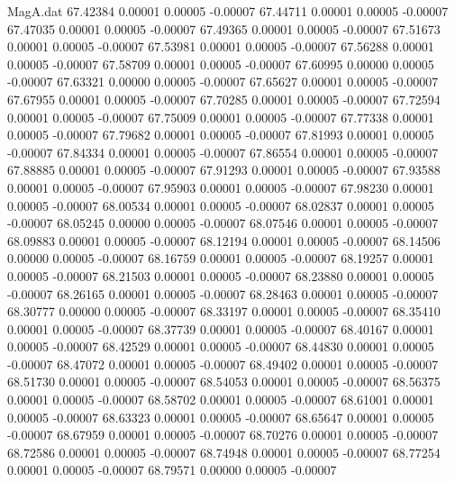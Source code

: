 \begin{filecontents}{MagA.dat}
  67.42384    0.00001    0.00005   -0.00007
  67.44711    0.00001    0.00005   -0.00007
  67.47035    0.00001    0.00005   -0.00007
  67.49365    0.00001    0.00005   -0.00007
  67.51673    0.00001    0.00005   -0.00007
  67.53981    0.00001    0.00005   -0.00007
  67.56288    0.00001    0.00005   -0.00007
  67.58709    0.00001    0.00005   -0.00007
  67.60995    0.00000    0.00005   -0.00007
  67.63321    0.00000    0.00005   -0.00007
  67.65627    0.00001    0.00005   -0.00007
  67.67955    0.00001    0.00005   -0.00007
  67.70285    0.00001    0.00005   -0.00007
  67.72594    0.00001    0.00005   -0.00007
  67.75009    0.00001    0.00005   -0.00007
  67.77338    0.00001    0.00005   -0.00007
  67.79682    0.00001    0.00005   -0.00007
  67.81993    0.00001    0.00005   -0.00007
  67.84334    0.00001    0.00005   -0.00007
  67.86554    0.00001    0.00005   -0.00007
  67.88885    0.00001    0.00005   -0.00007
  67.91293    0.00001    0.00005   -0.00007
  67.93588    0.00001    0.00005   -0.00007
  67.95903    0.00001    0.00005   -0.00007
  67.98230    0.00001    0.00005   -0.00007
  68.00534    0.00001    0.00005   -0.00007
  68.02837    0.00001    0.00005   -0.00007
  68.05245    0.00000    0.00005   -0.00007
  68.07546    0.00001    0.00005   -0.00007
  68.09883    0.00001    0.00005   -0.00007
  68.12194    0.00001    0.00005   -0.00007
  68.14506    0.00000    0.00005   -0.00007
  68.16759    0.00001    0.00005   -0.00007
  68.19257    0.00001    0.00005   -0.00007
  68.21503    0.00001    0.00005   -0.00007
  68.23880    0.00001    0.00005   -0.00007
  68.26165    0.00001    0.00005   -0.00007
  68.28463    0.00001    0.00005   -0.00007
  68.30777    0.00000    0.00005   -0.00007
  68.33197    0.00001    0.00005   -0.00007
  68.35410    0.00001    0.00005   -0.00007
  68.37739    0.00001    0.00005   -0.00007
  68.40167    0.00001    0.00005   -0.00007
  68.42529    0.00001    0.00005   -0.00007
  68.44830    0.00001    0.00005   -0.00007
  68.47072    0.00001    0.00005   -0.00007
  68.49402    0.00001    0.00005   -0.00007
  68.51730    0.00001    0.00005   -0.00007
  68.54053    0.00001    0.00005   -0.00007
  68.56375    0.00001    0.00005   -0.00007
  68.58702    0.00001    0.00005   -0.00007
  68.61001    0.00001    0.00005   -0.00007
  68.63323    0.00001    0.00005   -0.00007
  68.65647    0.00001    0.00005   -0.00007
  68.67959    0.00001    0.00005   -0.00007
  68.70276    0.00001    0.00005   -0.00007
  68.72586    0.00001    0.00005   -0.00007
  68.74948    0.00001    0.00005   -0.00007
  68.77254    0.00001    0.00005   -0.00007
  68.79571    0.00000    0.00005   -0.00007

\end{filecontents}
